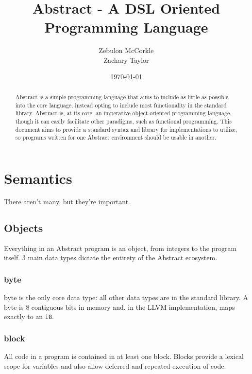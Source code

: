 \documentclass[letterpaper,titlepage]{scrreprt}
\title{Abstract - A DSL Oriented Programming Language}
\subtitle{\textipa{[\ae{}b 'str\ae{}kt]}}
\author{Zebulon McCorkle\\[1ex] 
\small Zachary Taylor}
\date{\today}
\begin{document}
\maketitle

\begin{abstract}
Abstract is a simple programming language that aims to include as little as possible into the core language, instead opting to include most functionality in the standard library. Abstract is, at its core, an imperative object-oriented programming language, though it can easily facilitate other paradigms, such as functional programming. This document aims to provide a standard syntax and library for implementations to utilize, so programs written for one Abstract environment should be usable in another.
\end{abstract}

\iffalse
\chapter{Introduction}
\label{ch:Introduction}
\fi

\chapter{Semantics}
\label{ch:Semantics}

There aren't many, but they're important.

\section{Objects}
\label{ch:Objects}

Everything in an Abstract program is an object, from integers to the program itself. 3 main data types dictate the entirety of the Abstract ecosystem.

\subsection{byte}
\label{subsec:byte}

byte is the only core data type: all other data types are in the standard library. A byte is 8 contiguous bits in memory and, in the LLVM implementation, maps exactly to an \lstinline{i8}.

\subsection{block}
\label{subsec:block}

All code in a program is contained in at least one block. Blocks provide a lexical scope for variables and also allow deferred and repeated execution of code.
\end{document}
